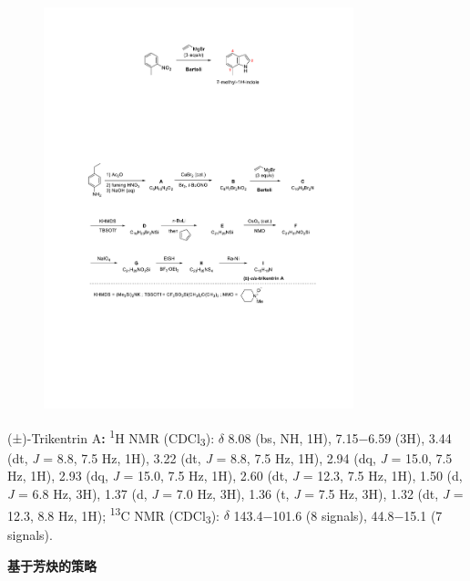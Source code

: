 \begin{figure}[h]
	\centering
	\includegraphics[width=9cm]{./pic/t7-2.pdf}
\end{figure}

\noindent(±)-Trikentrin A\textbf{:} \textsuperscript{1}H NMR
(CDCl\textsubscript{3}): $\delta$ 8.08 (bs, NH, 1H), 7.15−6.59 (3H), 3.44 (dt, \emph{J} = 8.8, 7.5 Hz, 1H), 3.22 (dt, \emph{J} = 8.8, 7.5 Hz, 1H), 2.94 (dq, \emph{J} = 15.0, 7.5 Hz, 1H), 2.93 (dq, \emph{J} = 15.0, 7.5 Hz, 1H), 2.60 (dt, \emph{J} = 12.3, 7.5 Hz, 1H), 1.50 (d, \emph{J} = 6.8 Hz, 3H), 1.37 (d, \emph{J} = 7.0 Hz, 3H), 1.36 (t, \emph{J} = 7.5 Hz, 3H), 1.32 (dt, \emph{J} = 12.3, 8.8 Hz, 1H); \textsuperscript{13}C NMR (CDCl\textsubscript{3}): $\delta$ 143.4−101.6 (8 signals), 44.8−15.1 (7 signals).

\newpage\noindent\textbf{基于芳炔的策略}

